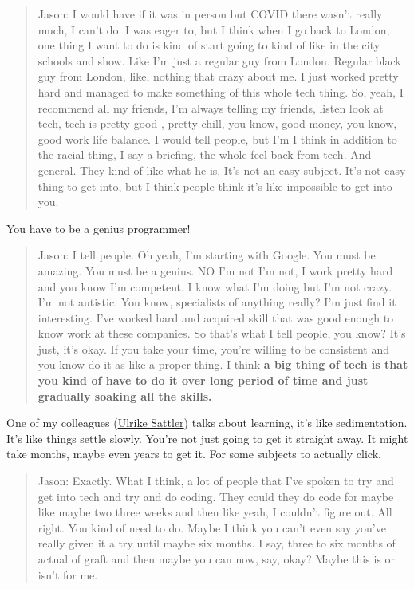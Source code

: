 \documentclass[
]{book}
\begin{document}
\begin{quote}
Jason: I would have if it was in person but COVID there wasn't really much, I can't do. I was eager to, but I think when I go back to London, one thing I want to do is kind of start going to kind of like in the city schools and show. Like I'm just a regular guy from London. Regular black guy from London, like, nothing that crazy about me. I just worked pretty hard and managed to make something of this whole tech thing. So, yeah, I recommend all my friends, I'm always telling my friends, listen look at tech, tech is pretty good , pretty chill, you know, good money, you know, good work life balance. I would tell people, but I'm I think in addition to the racial thing, I say a briefing, the whole feel back from tech. And general. They kind of like what he is. It's not an easy subject. It's not easy thing to get into, but I think people think it's like impossible to get into you.
\end{quote}

You have to be a genius programmer!

\begin{quote}
Jason: I tell people. Oh yeah, I'm starting with Google. You must be amazing. You must be a genius. NO I'm not I'm not, I work pretty hard and you know I'm competent. I know what I'm doing but I'm not crazy. I'm not autistic. You know, specialists of anything really? I'm just find it interesting. I've worked hard and acquired skill that was good enough to know work at these companies. So that's what I tell people, you know? It's just, it's okay. If you take your time, you're willing to be consistent and you know do it as like a proper thing. I think \textbf{a big thing of tech is that you kind of have to do it over long period of time and just gradually soaking all the skills.}
\end{quote}

One of my colleagues (\href{http://www.cs.man.ac.uk/~sattler/}{Ulrike Sattler}) talks about learning, it's like sedimentation. It's like things settle slowly. You're not just going to get it straight away. It might take months, maybe even years to get it. For some subjects to actually click.

\begin{quote}
Jason: Exactly. What I think, a lot of people that I've spoken to try and get into tech and try and do coding. They could they do code for maybe like maybe two three weeks and then like yeah, I couldn't figure out. All right. You kind of need to do. Maybe I think you can't even say you've really given it a try until maybe six months. I say, three to six months of actual of graft and then maybe you can now, say, okay? Maybe this is or isn't for me.
\end{quote}
\end{document}
